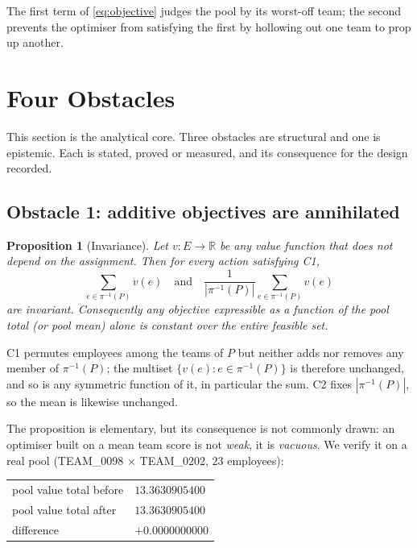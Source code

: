 \documentclass[conference]{IEEEtran}
\newtheorem{proposition}{Proposition}
\newcommand{\vv}{v}
\newcommand{\R}{\mathbb{R}}
\begin{document}
The first term of \eqref{eq:objective} judges the pool by its worst-off team; the
second prevents the optimiser from satisfying the first by hollowing out one team
to prop up another.

\section{Four Obstacles}\label{sec:obstacles}

This section is the analytical core. Three obstacles are structural and one is
epistemic. Each is stated, proved or measured, and its consequence for the design
recorded.

\subsection{Obstacle 1: additive objectives are annihilated}

\begin{proposition}[Invariance]\label{prop:invariance}
Let $\vv:E\to\R$ be any value function that does not depend on the assignment.
Then for every action satisfying \emph{C1},
\[
\sum_{e\in \pi^{-1}(P)}\vv(e) \quad\text{and}\quad
\frac{1}{|\pi^{-1}(P)|}\sum_{e\in\pi^{-1}(P)}\vv(e)
\]
are invariant. Consequently any objective expressible as a function of the pool
total (or pool mean) alone is \emph{constant} over the entire feasible set.
\end{proposition}

\begin{IEEEproof}
C1 permutes employees among the teams of $P$ but neither adds nor removes any
member of $\pi^{-1}(P)$; the multiset $\{\vv(e) : e\in\pi^{-1}(P)\}$ is therefore
unchanged, and so is any symmetric function of it, in particular the sum. C2
fixes $|\pi^{-1}(P)|$, so the mean is likewise unchanged.
\end{IEEEproof}

The proposition is elementary, but its consequence is not commonly drawn: an
optimiser built on a mean team score is not \emph{weak}, it is \emph{vacuous}. We
verify it on a real pool (TEAM\_0098 $\times$ TEAM\_0202, $23$ employees):

\begin{center}\small
\begin{tabular}{ll}
\toprule
pool value total before & $13.3630905400$\\
pool value total after  & $13.3630905400$\\
difference              & $+0.0000000000$\\
\bottomrule
\end{tabular}
\end{center}
\end{document}
